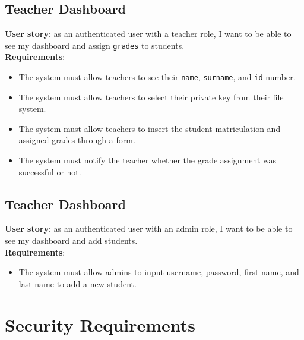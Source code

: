 \subsection{Teacher Dashboard}

\noindent\textbf{User story}: as an authenticated user with a teacher role, I want to be able to see my dashboard and assign \texttt{grades} to students.\\
\noindent\textbf{Requirements}:
\begin{itemize}
    \item The system must allow teachers to see their \texttt{name}, \texttt{surname}, and \texttt{id} number.
    \item The system must allow teachers to select their private key from their file system.
    \item The system must allow teachers to insert the student matriculation and assigned grades through a form.
    \item The system must notify the teacher whether the grade assignment was successful or not. 
\end{itemize}

\subsection{Teacher Dashboard}

\noindent\textbf{User story}: as an authenticated user with an admin role, I want to be able to see my dashboard and add students.\\
\noindent\textbf{Requirements}:
\begin{itemize}
    \item The system must allow admins to input username, password, first name, and last name to add a new student.
\end{itemize}

\section{Security Requirements}

